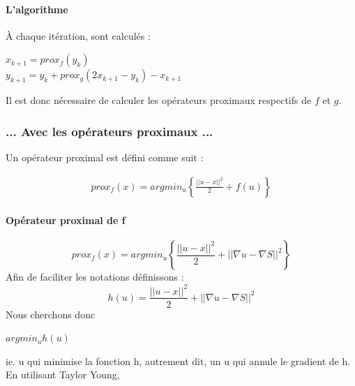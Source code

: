 \paragraph{L'algorithme}
À chaque itération, sont calculés : 
\begin{center}
$x_{k+1} = prox_f(y_k)$\\
$y_{k+1} = y_k+prox_g(2x_{k+1}-y_k)-x_{k+1}$
\end{center}{}
Il est donc nécessaire de calculer les opérateurs proximaux respectifs de $f$ et $g$. 
\subsubsection{... Avec les opérateurs proximaux ...}
Un opérateur proximal est défini comme suit : 
\begin{center}
\begin{equation*}
\begin{aligned}
prox_f(x) = argmin_u \left\{ \frac{||u-x||^2}{2}+ f(u)\right\}
\end{aligned}
\end{equation*}
\end{center}
\cite{Opti}
\paragraph{Opérateur proximal de f}
\begin{equation*}
prox_f(x) = argmin_u\left\{\frac{||u-x||^2}{2}+||\nabla u -\nabla S ||^2 \right\}
\end{equation*}
Afin de faciliter les notations définissons :
\begin{equation*}
h(u) = \frac{||u-x||^2}{2}+||\nabla u -\nabla S ||^2
\end{equation*} 
Nous cherchons donc 
\begin{center}
$argmin_u h(u)$
\end{center}
ie. u qui minimise la fonction h, autrement dit, un u qui annule le gradient de h.\\
En utilisant Taylor Young, 


